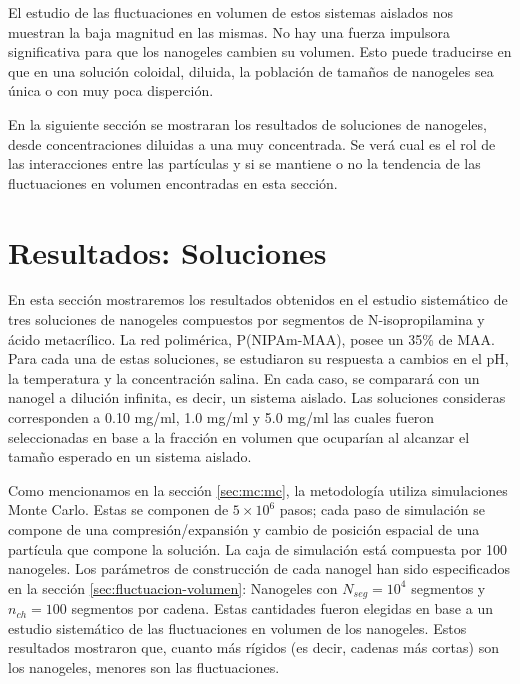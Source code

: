 	
	El estudio de las fluctuaciones en volumen de estos sistemas aislados nos muestran la baja magnitud en las mismas. No hay una fuerza impulsora significativa para que los nanogeles cambien su volumen. Esto puede traducirse en que en una soluci\'on coloidal, diluida, la poblaci\'on de tama\~nos de nanogeles sea \'unica o con muy poca disperci\'on. 
	
	En la siguiente secci\'on se mostraran los resultados de soluciones de nanogeles, desde concentraciones diluidas a una muy concentrada.
	Se ver\'a cual es el rol de las interacciones entre las part\'iculas y si se mantiene o no la tendencia de las fluctuaciones en volumen encontradas en esta secci\'on.
	
	\section{Resultados: Soluciones}
	
	En esta secci\'on mostraremos los resultados obtenidos en el estudio sistem\'atico de tres soluciones de nanogeles compuestos por segmentos de N-isopropilamina y \'acido metacr\'ilico. La red polim\'erica, P(NIPAm-MAA), posee un 35\% de MAA. Para cada una de estas soluciones, se estudiaron su respuesta a cambios en el pH, la temperatura y la concentraci\'on salina. En cada caso, se comparar\'a con un nanogel a diluci\'on infinita, es decir, un sistema aislado. Las soluciones consideras corresponden a 0.10 mg/ml, 1.0 mg/ml y 5.0 mg/ml las cuales fueron seleccionadas en base a la fracción en volumen que ocupar\'ian al alcanzar el tama\~no esperado en un sistema aislado.
	
	Como mencionamos en la secci\'on \ref{sec:mc:mc}, la metodolog\'ia utiliza simulaciones Monte Carlo. Estas se componen de $5\times 10^6$ pasos; cada paso de simulaci\'on se compone de una compresi\'on/expansi\'on y cambio de posici\'on espacial de una part\'icula que compone la soluci\'on. La caja de simulaci\'on est\'a compuesta por 100 nanogeles. Los par\'ametros de construcci\'on de cada nanogel han sido especificados en la secci\'on \ref{sec:fluctuacion-volumen}: Nanogeles con $N_{seg} = 10^4$ segmentos y $n_{ch} = 100$ segmentos por cadena. Estas cantidades fueron elegidas en base a un estudio sistem\'atico de las fluctuaciones en volumen de los nanogeles. Estos resultados mostraron que, cuanto m\'as r\'igidos (es decir, cadenas m\'as cortas) son los nanogeles, menores son las fluctuaciones. %
	
